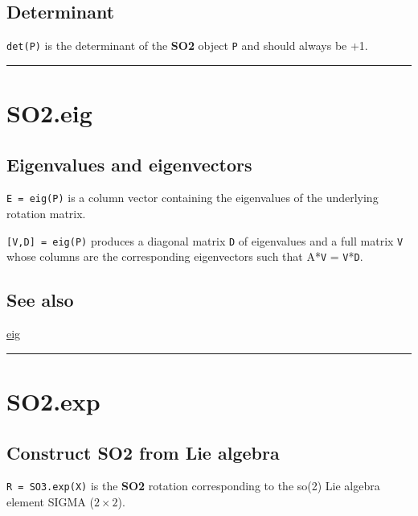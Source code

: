 \subsection*{Determinant}


\texttt{det(P)} is the determinant of the \textbf{\color{red} SO2} object \texttt{P} and should always be +1.

\vspace{1.5ex}\hrule

\hypertarget{SO2.eig}{\section*{SO2.eig}}
\subsection*{Eigenvalues and eigenvectors}


\texttt{E = eig(P)} is a column vector containing the eigenvalues of the
underlying rotation matrix.



\texttt{[V,D] = eig(P)} produces a diagonal matrix \texttt{D} of eigenvalues and
a full matrix \texttt{V} whose columns are the corresponding eigenvectors
such that A*\texttt{V} = \texttt{V}*\texttt{D}.


\subsection*{See also}


\hyperlink{eig}{\color{blue} eig}

\vspace{1.5ex}\hrule

\hypertarget{SO2.exp}{\section*{SO2.exp}}
\subsection*{Construct SO2 from Lie algebra}


\texttt{R = SO3.exp(X)} is the \textbf{\color{red} SO2} rotation corresponding to the so(2)
Lie algebra element SIGMA ($2 \times 2$).



